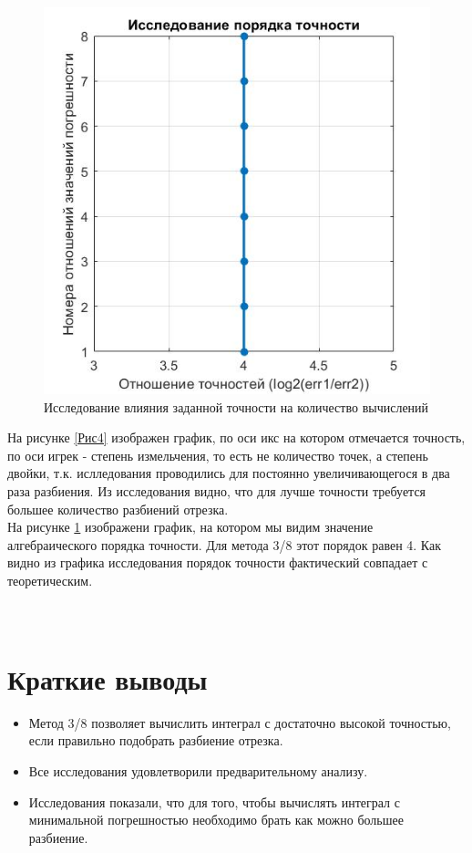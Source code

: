 \documentclass[a4paper]{article}
\begin{document}
\begin{figure}[h!]
\begin{center}
\includegraphics[scale=0.8]{порядок точности.jpg} 
\end{center}
\caption{Исследование влияния заданной точности на количество вычислений} \label{Рис5}
\end{figure}

 На рисунке \ref{Рис4}  изображен график, по оси икс на котором отмечается точность, по оси игрек - степень измельчения, то есть не количество точек, а степень двойки, т.к. ислледования проводились для постоянно увеличивающегося в два раза разбиения. Из исследования видно, что для лучше точности требуется большее количество разбиений отрезка.\\ 
На рисунке \ref{Рис5} изображени график, на котором мы видим значение алгебраического порядка точности. Для метода 3/8 этот порядок равен 4. Как видно из графика исследования порядок точности фактический совпадает с теоретическим. \\
\\
\\




\newpage 
\newpage
\section{Краткие выводы} 

\begin{itemize}
  \item Метод 3/8 позволяет вычислить интеграл с достаточно высокой точностью, если правильно подобрать разбиение отрезка.
  \item Все исследования удовлетворили предварительному анализу.
  \item Исследования показали, что для того, чтобы вычислять интеграл с минимальной погрешностью необходимо брать как можно большее разбиение. 
  \end{itemize}
\end{document}
